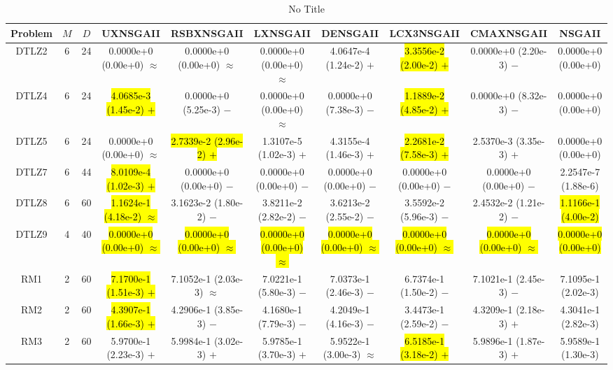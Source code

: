 \documentclass[journal]{IEEEtran}
\begin{document}
\begin{table*}[htbp]
\renewcommand{\arraystretch}{1.2}
\centering
\caption{No Title}
\begin{tabular}{cccccccccc}
\toprule
Problem&$M$&$D$&UXNSGAII&RSBXNSGAII&LXNSGAII&DENSGAII&LCX3NSGAII&CMAXNSGAII&NSGAII\\
\midrule
\multirow{1}{*}{DTLZ2}&6&24&0.0000e+0 (0.00e+0) $\approx$&0.0000e+0 (0.00e+0) $\approx$&0.0000e+0 (0.00e+0) $\approx$&4.0647e-4 (1.24e-2) $+$&\hl{3.3556e-2 (2.00e-2) $+$}&0.0000e+0 (2.20e-3) $-$&0.0000e+0 (0.00e+0)\\
\hline
\multirow{1}{*}{DTLZ4}&6&24&\hl{4.0685e-3 (1.45e-2) $+$}&0.0000e+0 (5.25e-3) $-$&0.0000e+0 (0.00e+0) $\approx$&0.0000e+0 (7.38e-3) $-$&\hl{1.1889e-2 (4.85e-2) $+$}&0.0000e+0 (8.32e-3) $-$&0.0000e+0 (0.00e+0)\\
\hline
\multirow{1}{*}{DTLZ5}&6&24&0.0000e+0 (0.00e+0) $\approx$&\hl{2.7339e-2 (2.96e-2) $+$}&1.3107e-5 (1.02e-3) $+$&4.3155e-4 (1.46e-3) $+$&\hl{2.2681e-2 (7.58e-3) $+$}&2.5370e-3 (3.35e-3) $+$&0.0000e+0 (0.00e+0)\\
\hline
\multirow{1}{*}{DTLZ7}&6&44&\hl{8.0109e-4 (1.02e-3) $+$}&0.0000e+0 (0.00e+0) $-$&0.0000e+0 (0.00e+0) $-$&0.0000e+0 (0.00e+0) $-$&0.0000e+0 (0.00e+0) $-$&0.0000e+0 (0.00e+0) $-$&2.2547e-7 (1.88e-6)\\
\hline
\multirow{1}{*}{DTLZ8}&6&60&\hl{1.1624e-1 (4.18e-2) $\approx$}&3.1623e-2 (1.80e-2) $-$&3.8211e-2 (2.82e-2) $-$&3.6213e-2 (2.55e-2) $-$&3.5592e-2 (5.96e-3) $-$&2.4532e-2 (1.21e-2) $-$&\hl{1.1166e-1 (4.00e-2)}\\
\hline
\multirow{1}{*}{DTLZ9}&4&40&\hl{0.0000e+0 (0.00e+0) $\approx$}&\hl{0.0000e+0 (0.00e+0) $\approx$}&\hl{0.0000e+0 (0.00e+0) $\approx$}&\hl{0.0000e+0 (0.00e+0) $\approx$}&\hl{0.0000e+0 (0.00e+0) $\approx$}&\hl{0.0000e+0 (0.00e+0) $\approx$}&\hl{0.0000e+0 (0.00e+0)}\\
\hline
\multirow{1}{*}{RM1}&2&60&\hl{7.1700e-1 (1.51e-3) $+$}&7.1052e-1 (2.03e-3) $\approx$&7.0221e-1 (5.80e-3) $-$&7.0373e-1 (2.46e-3) $-$&6.7374e-1 (1.50e-2) $-$&7.1021e-1 (2.45e-3) $-$&7.1095e-1 (2.02e-3)\\
\hline
\multirow{1}{*}{RM2}&2&60&\hl{4.3907e-1 (1.66e-3) $+$}&4.2906e-1 (3.85e-3) $-$&4.1680e-1 (7.79e-3) $-$&4.2049e-1 (4.16e-3) $-$&3.4473e-1 (2.59e-2) $-$&4.3209e-1 (2.18e-3) $+$&4.3041e-1 (2.82e-3)\\
\hline
\multirow{1}{*}{RM3}&2&60&5.9700e-1 (2.23e-3) $+$&5.9984e-1 (3.02e-3) $+$&5.9785e-1 (3.70e-3) $+$&5.9522e-1 (3.00e-3) $\approx$&\hl{6.5185e-1 (3.18e-2) $+$}&5.9896e-1 (1.87e-3) $+$&5.9589e-1 (1.30e-3)\\

\end{tabular}
\end{table*}
\end{document}

